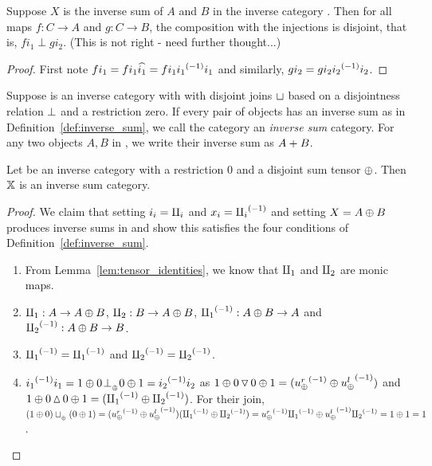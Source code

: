 \begin{lemma}\label{lem:all_maps_to_inverse_sum_are_disjoint}
  Suppose $X$ is the inverse sum of $A$ and $B$ in the inverse category \X. Then for all maps
  $f:C \to A$ and $g: C \to B$, the composition with the injections is disjoint, that is,
  $f i_1 \perp g i_2$. (This is not right - need further thought...)
\end{lemma}
\begin{proof}
  First note $f i_1 = f i_1 \widehat{i_1} = f i_1 {i_1}^{(-1)} i_1$ and similarly, $g i_2 = g i_2
  {i_2}^{(-1)} i_2$.
\end{proof}

\begin{definition}\label{def:inverse_sum_category}
  Suppose \X is an inverse category with with disjoint joins $\sqcup$ based on a disjointness
  relation $\perp$ and a restriction zero. If every pair of objects has an inverse sum as in
  Definition~\ref{def:inverse_sum}, we call the category an \emph{inverse sum} category. For any
  two objects $A,B$ in \X, we write their inverse sum as ${{A}+{B}}$.
\end{definition}

\begin{lemma}\label{lem:tensor_disjoint_sum_cats_are_inverse_sum_categories}
  Let \X be an inverse category with a restriction 0 and a disjoint sum tensor $\oplus$. Then $\mathbb{X}$ is
  an inverse sum category.
\end{lemma}
\begin{proof}
  We claim that setting $i_i = \amalg_{i}$ and $x_i = {\amalg_{i}}^{(-1)}$ and setting $X = A\oplus B$ produces inverse
  sums in \X and show this satisfies the four conditions of Definition~\ref{def:inverse_sum}.
  \begin{enumerate}[{(}i{)}]
    \item From Lemma~\ref{lem:tensor_identities}, we know that $\amalg_{1}$ and $\amalg_{2}$ are monic maps.
    \item $\amalg_{1} : A \to A\oplus B$, $\amalg_{2}: B \to A\oplus B$, ${\amalg_{1}}^{(-1)}: A\oplus B \to A$ and ${\amalg_{2}}^{(-1)}: A\oplus B \to B$.
    \item ${\amalg_{1}}^{(-1)} = {\amalg_{1}}^{(-1)}$ and ${\amalg_{2}}^{(-1)} = {\amalg_{2}}^{(-1)}$.
    \item ${i_1}^{(-1)}i_1 = 1\oplus 0 {}_{{}_{}}{\perp_{{}_{\oplus}}} 0\oplus1 = {i_2}^{(-1)}i_2$ as
      $1\oplus0 \operatorname{\triangledown} 0\oplus1 = ({u_{\oplus}^r}^{(-1)}\oplus{\ensuremath{u_{\oplus}^l}}^{(-1)})$ and
      $1\oplus0 \operatorname{\vartriangle} 0\oplus1 = ({\amalg_{1}}^{(-1)}\oplus{\amalg_{2}}^{(-1)})$. For their join,
      $(1\oplus0)\sqcup_{{_{\oplus}}} (0\oplus1) = ({u_{\oplus}^r}^{(-1)}\oplus{\ensuremath{u_{\oplus}^l}}^{(-1)})({\amalg_{1}}^{(-1)}\oplus{\amalg_{2}}^{(-1)}) =
      {u_{\oplus}^r}^{(-1)}{\amalg_{1}}^{(-1)} \oplus {\ensuremath{u_{\oplus}^l}}^{(-1)}{\amalg_{2}}^{(-1)} = 1\oplus1 = 1$.
  \end{enumerate}
\end{proof}

